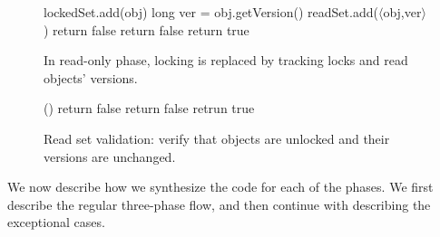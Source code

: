 \begin{figure}
\centering
\codesize
\begin{algorithmic}[1]{}
		{\ttfamily
		\State{}lockedSet.add(obj) \label{code:lockedSet:add}
			\State long ver = obj.getVersion() \label{code:track:getVersion}
			\State readSet.add($\langle$obj,ver$\rangle$)
			 \label{code:track:verifyVersion}
				 return false
			\EndIf
			 \label{code:track:verifyUnlocked}
				 return false \label{code:track:verifyUnlockedB}
			\EndIf
			\State return true
		\EndFunction
		}
\end{algorithmic}
\caption{In read-only phase, locking is replaced by
tracking locks and read objects' versions.
\label{figure::track}}
\end{figure}
\begin{figure}
\centering
\codesize
\begin{algorithmic}[1]{}
		{\ttfamily
		()
			\State return false  \label{code:validate:verifyUnlocked}
			\EndIf
				\State return false  \label{code:validate:verifyVersion}
			\EndIf
		\EndFor
		\State retrun true 
		\EndFunction
		}
\end{algorithmic}
\caption{Read set validation: verify that  objects are unlocked and their versions are unchanged.\label{figure::validate}}
\end{figure}

We now describe how we synthesize the code for each of the phases. 
We first describe the regular three-phase flow, and then continue with describing the exceptional cases.

